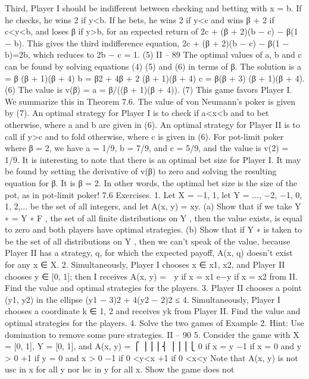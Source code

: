Third, Player I should be indifferent between checking and betting with x = b. If he
checks, he wins 2 if y<b. If he bets, he wins 2 if y<c and wins β + 2 if c<y<b, and
loses β if y>b, for an expected return of 2c + (β + 2)(b − c) − β(1 − b). This gives the
third indifference equation,
2c + (β + 2)(b − c) − β(1 − b)=2b,
which reduces to
2b − c = 1. (5)
II – 89
The optimal values of a, b and c can be found by solving equations (4) (5) and (6) in
terms of β. The solution is
a = β
(β + 1)(β + 4) b = β2 + 4β + 2
(β + 1)(β + 4) c = β(β + 3)
(β + 1)(β + 4). (6)
The value is
v(β) = a = β/((β + 1)(β + 4)). (7)
This game favors Player I. We summarize this in
Theorem 7.6. The value of von Neumann’s poker is given by (7). An optimal strategy
for Player I is to check if a<x<b and to bet otherwise, where a and b are given in (6).
An optimal strategy for Player II is to call if y>c and to fold otherwise, where c is given
in (6).
For pot-limit poker where β = 2, we have a = 1/9, b = 7/9, and c = 5/9, and the
value is v(2) = 1/9.
It is interesting to note that there is an optimal bet size for Player I. It may be found
by setting the derivative of v(β) to zero and solving the resulting equation for β. It is
β = 2. In other words, the optimal bet size is the size of the pot, as in pot-limit poker!
7.6 Exercises.
1. Let X = {−1, 1}, let Y = {..., −2, −1, 0, 1, 2,...} be the set of all integers, and let
A(x, y) = xy.
(a) Show that if we take Y ∗ = Y ∗
F , the set of all finite distributions on Y , then the
value exists, is equal to zero and both players have optimal strategies.
(b) Show that if Y ∗ is taken to be the set of all distributions on Y , then we can’t speak
of the value, because Player II has a strategy, q, for which the expected payoff, A(x, q)
doesn’t exist for any x ∈ X.
2. Simultaneously, Player I chooses x ∈ {x1, x2}, and Player II chooses y ∈ [0, 1]; then
I receives
A(x, y) =  y if x = x1
e−y if x = x2
from II. Find the value and optimal strategies for the players.
3. Player II chooses a point (y1, y2) in the ellipse (y1 − 3)2 + 4(y2 − 2)2 ≤ 4. Simultaneously,
Player I chooses a coordinate k ∈ {1, 2} and receives yk from Player II. Find the
value and optimal strategies for the players.
4. Solve the two games of Example 2. Hint: Use domination to remove some pure
strategies.
II – 90
5. Consider the game with X = [0, 1], Y = [0, 1], and
A(x, y) =
⎧
⎪⎪⎪⎨
⎪⎪⎪⎩
0 if x = y
−1 if x = 0 and y > 0
+1 if y = 0 and x > 0
−1 if 0 <y<x
+1 if 0 <x<y
Note that A(x, y) is not usc in x for all y nor lsc in y for all x. Show the game does not
